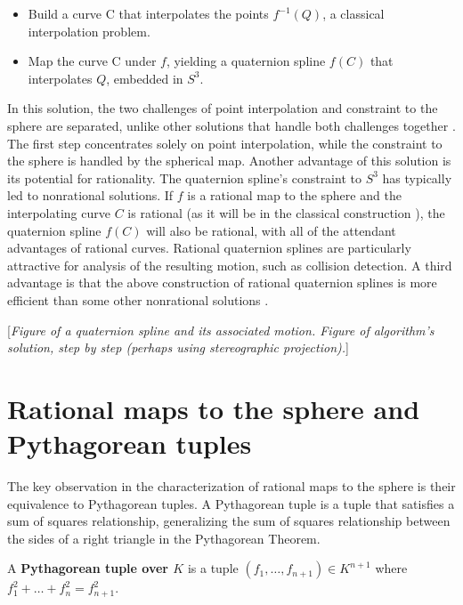 \documentclass[11pt]{article}
\begin{document}
\begin{itemize}
\item Build a curve C that interpolates the points $f^{-1}(Q)$, a classical
      interpolation problem.
\item Map the curve C under $f$, yielding a quaternion spline $f(C)$ 
      that interpolates $Q$, embedded in $S^3$.
\end{itemize}

In this solution, the two challenges of point interpolation and
constraint to the sphere are separated,
unlike other solutions that handle both challenges together \cite{animationtext}.
The first step concentrates solely on point interpolation,
while the constraint to the sphere is handled by the spherical map.
Another advantage of this solution is its potential for rationality.
The quaternion spline's constraint to $S^3$ has typically led to nonrational solutions.
If $f$ is a rational map to the sphere
and the interpolating curve $C$ is rational (as it will be in the 
classical construction \cite{farin}),
the quaternion spline $f(C)$ will also be rational, with all of the 
attendant advantages of rational curves.
Rational quaternion splines are particularly attractive for analysis of the 
resulting motion, such as collision detection.
A third advantage is that the above construction of rational quaternion splines 
is more efficient than some other nonrational solutions \cite{barr92,barrafter92}.

[{\em Figure of a quaternion spline and its associated motion.
Figure of algorithm's solution, step by step (perhaps using stereographic projection).}]

\clearpage

\section{Rational maps to the sphere and Pythagorean tuples}
\label{sec:ratpy}

The key observation in the characterization of rational maps to the sphere is their
equivalence to Pythagorean tuples.
A Pythagorean tuple is a tuple that satisfies a sum of squares relationship,
generalizing the sum of squares relationship between the sides of a right triangle
in the Pythagorean Theorem.

\begin{defn2}
A {\bf Pythagorean tuple over $K$} %
is a tuple $(f_1,\ldots,f_{n+1}) \in K^{n+1}$
where $f_1^2 + \ldots + f_n^2 = f_{n+1}^2$.
\end{defn2}
\end{document}
